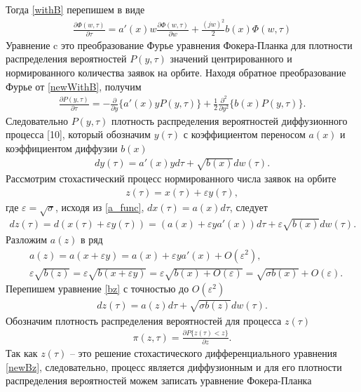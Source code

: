 Тогда \eqref{withB} перепишем в виде
\begin{align}\label{newWithB}
	\frac{\partial \Phi (w,\tau)}{\partial \tau}=a'(x) w\frac{\partial \Phi (w,\tau)}{\partial w}+\frac{(jw)^2}{2}b(x)\Phi(w,\tau)
\end{align}
Уравнение c это преобразование Фурье уравнения Фокера-Планка для плотности распределения вероятностей $P(y, \tau )$ значений центрированного и нормированного количества заявок на орбите. Находя обратное преобразование Фурье от \eqref{newWithB}, получим
\begin{align}
	\frac{\partial P (y,\tau)}{\partial \tau}=-\frac{\partial}{\partial y}\{a'(x)yP(y,\tau)\} 
	+\frac{1}{2}\frac{\partial^2}{\partial y^2}\{b(x)P(y,\tau)\}.
\end{align}
Следовательно $P (y,\tau)$ плотность распределения вероятностей диффузионного процесса [10], который обозначим $y(\tau)$ с коэффициентом переносом $a(x)$ и коэффициентом диффузии $b(x)$
\begin{align}
	dy(\tau)=a'(x)yd\tau+\sqrt{b(x)}dw(\tau).
\end{align}
Рассмотрим стохастический процесс нормированного числа заявок на орбите
\begin{align}
	z(\tau)=x(\tau)+\varepsilon y(\tau),
\end{align}
где $\varepsilon=\sqrt{\sigma}$, исходя из  \eqref{a_func}, $dx(\tau)=a(x)d\tau$, следует
\begin{align}\label{bz}
	dz(\tau)=d(x(\tau)+\varepsilon y(\tau))=(a(x)+\varepsilon ya'(x))d\tau+\varepsilon \sqrt{b(x)}dw(\tau).
\end{align}
Разложим $a(z)$ в ряд 
\begin{align*}
	&a(z)=a(x+\varepsilon y)=a(x)+\varepsilon y a'(x)+O(\varepsilon^2),\\
	&\varepsilon\sqrt{b(z)}=\varepsilon\sqrt{b(x+\varepsilon y)}=\varepsilon\sqrt{b(x)+O(\varepsilon)}=\sqrt{\sigma b(x)}+O(\varepsilon).
\end{align*}
Перепишем уравнение \eqref{bz} с точностью до $O(\varepsilon^2)$
\begin{align}\label{newBz}
	dz(\tau)=a(z)d\tau+\sqrt{\sigma b(z)}dw(\tau).
\end{align}
Обозначим плотность распределения вероятностей для процесса $z(\tau)$
\begin{align*}
	\pi(z,\tau)=\frac{\partial P\{z(\tau)<z\}}{\partial z}.
\end{align*}
Так как $z(\tau)$ -- это решение стохастического дифференциального уравнения \eqref{newBz}, следовательно, процесс является диффузионным и для его плотности распределения вероятностей можем записать уравнение Фокера-Планка
